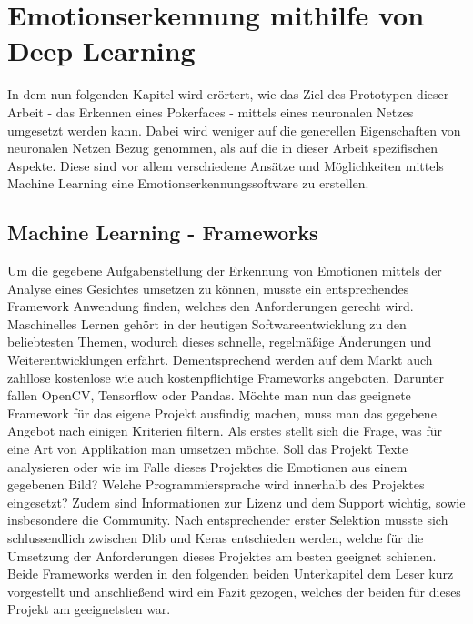 \documentclass[12pt, a4paper]{report}
\begin{document}
\section{Emotionserkennung mithilfe von Deep Learning}
In dem nun folgenden Kapitel wird erörtert, wie das Ziel des Prototypen dieser Arbeit - das Erkennen eines Pokerfaces - mittels eines neuronalen Netzes umgesetzt werden kann. Dabei wird weniger auf die generellen Eigenschaften von neuronalen Netzen Bezug genommen, als auf die in dieser Arbeit spezifischen Aspekte. Diese sind vor allem verschiedene Ansätze und Möglichkeiten mittels Machine Learning eine Emotionserkennungssoftware zu erstellen.

\subsection{Machine Learning - Frameworks}
Um die gegebene Aufgabenstellung der Erkennung von Emotionen mittels der Analyse eines Gesichtes umsetzen zu können, musste ein entsprechendes Framework Anwendung finden, welches den Anforderungen gerecht wird. Maschinelles Lernen gehört in der heutigen Softwareentwicklung zu den beliebtesten Themen, wodurch dieses schnelle, regelmäßige Änderungen und Weiterentwicklungen erfährt. Dementsprechend werden auf dem Markt auch zahllose kostenlose wie auch kostenpflichtige Frameworks angeboten. Darunter fallen OpenCV, Tensorflow oder Pandas. Möchte man nun das geeignete Framework für das eigene Projekt ausfindig machen, muss man das gegebene Angebot nach einigen Kriterien filtern. Als erstes stellt sich die Frage, was für eine Art von Applikation man umsetzen möchte. Soll das Projekt Texte analysieren oder wie im Falle dieses Projektes die Emotionen aus einem gegebenen Bild? Welche Programmiersprache wird innerhalb des Projektes eingesetzt? Zudem sind Informationen zur Lizenz und dem Support wichtig, sowie insbesondere die Community.\newline
Nach entsprechender erster Selektion musste sich schlussendlich zwischen Dlib und Keras entschieden werden, welche für die Umsetzung der Anforderungen dieses Projektes am besten geeignet schienen. Beide Frameworks werden in den folgenden beiden Unterkapitel dem Leser kurz vorgestellt und anschließend wird ein Fazit gezogen, welches der beiden für dieses Projekt am geeignetsten war.
\end{document}
